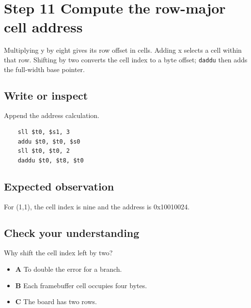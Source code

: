 \section{Step 11 Compute the row-major cell
  address}\label{007-bresenham-line-s11-step-11-compute-the-row-major-cell-address}

Multiplying y by eight gives its row offset in cells. Adding x selects a
cell within that row. Shifting by two converts the cell index to a byte
offset; \texttt{daddu} then adds the full-width base pointer.

\subsection{Write or
  inspect}\label{007-bresenham-line-s11-write-or-inspect}

Append the address calculation.

\begin{verbatim}
    sll $t0, $s1, 3
    addu $t0, $t0, $s0
    sll $t0, $t0, 2
    daddu $t0, $t8, $t0
\end{verbatim}

\subsection{Expected
  observation}\label{007-bresenham-line-s11-expected-observation}

For (1,1), the cell index is nine and the address is 0x10010024.

\subsection{Check your
  understanding}\label{007-bresenham-line-s11-check-your-understanding}

Why shift the cell index left by two?

\begin{itemize}
  \tightlist
  \item
        \textbf{A} To double the error for a branch.
  \item
        \textbf{B} Each framebuffer cell occupies four bytes.
  \item
        \textbf{C} The board has two rows.
\end{itemize}
